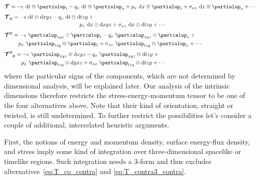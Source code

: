 \documentclass[\ifafour a4paper,12pt,\else a5paper,10pt,\fi%
onecolumn,oneside,article,%
british%
]{memoir}
\makeatletter
\theoremstyle{remark}
\theoremstyle{innote}
\newcommand*{\de}{\partialup}%
\newcommand*{\di}{\mathrm{d}}%
\renewcommand*{\|}[1][]{\nonscript\,#1\vert\nonscript\;\mathopen{}}
\newcommand*{\q}{}%
\DeclareRobustCommand*{\q}{%
  \mathbin{\mathpalette\bigcdot@{}}%
}
\newcommand*{\bigcdot@scalefactor}{0.7}
\newcommand*{\bigcdot@widthfactor}{1.5}
\newcommand*{\bigcdot@}[2]{%
  \sbox0{$#1\vcenter{}$}%
  \sbox2{$#1\cdot\m@th$}%
  \hbox to \bigcdot@widthfactor\wd2{%
    \hfil
    \raise\ht0\hbox{%
      \scalebox{\bigcdot@scalefactor}{%
        \lower\ht0\hbox{$#1\bullet\m@th$}%
      }%
    }%
    \hfil
  }%
}
\newcommand*{\yT}{\bm{\mathcal{T}}}
\renewcommand*{\i}{\indices}
\newcommand*{\en}{\epsilon}
\newcommand*{\yq}{q}
\newcommand*{\yp}{p}
\newcommand*{\yt}{\sigma}
\newcommand*{\rul}{{\mkern2mu\rule[-0.1ex]{0.75pt}{1.1ex}\mkern2mu}}
\DeclarePairedDelimiter\mul{\rul}{\rul}%
\makeatother
\begin{document}
\begin{subequations}
  \label{eq:T_alternatives}
  \begin{align}
    \label{eq:T_co_contra}
    &\yT\i{_{\q}^{\q}} = -\en\  \di t\otimes\de_{t} 
      -\yq_{x}\  \di t\otimes\de_{x} +
      \yp_{x}\  \di x\otimes\de_{t} +
      \yt_{x x}\  \di x\otimes\de_{x} + \dotsb
    \\[\jot]
    \label{eq:T_co_co3}
    &\!\begin{multlined}[b][0.85\textwidth]
      \yT\i{_{\q\mul{\q\q\q}}} =
      -\en\  \di t\otimes\di xyz 
      -\yq_{x}\  \di t\otimes\di tzy +{}\\
      \yp_{x}\  \di x\otimes\di xyz 
      +\yt_{x x}\  \di x\otimes\di tzy + \dotsb
    \end{multlined}
    \\[\jot]
    \label{eq:T_contra3_contra}
    &\!\begin{multlined}[b][0.85\textwidth]
      \yT\i{^{\mul{\q\q\q}\q}} = -\en\  \de_{xyz} \otimes\de_{t} 
      -\yq_{x}\  \de_{xyz}\otimes\de_{x} +{}\\
      \yp_{x}\  \de_{tzy} \otimes\de_{t} +
      \yt_{x x}\  \de_{tzy}\otimes\de_{x} + \dotsb
    \end{multlined}
    \\[\jot]
    \label{eq:T_contra3_co3}
    &\!\begin{multlined}[b][0.85\textwidth]
      \yT\i{^{\mul{\q\q\q}}_{\mul{\q\q\q}}} = -\en\  \de_{xyz} \otimes\di xyz 
      -\yq_{x}\  \de_{xyz}\otimes\di tzy +{}\\
      \yp_{x}\  \de_{tzy} \otimes\di yxz 
      + \yt_{x x}\  \de_{tzy}\otimes\di tzy
      + \dotsb
    \end{multlined}
  \end{align}
\end{subequations}
where the particular signs of the components, which are not determined by
dimensional analysis, will be explained later. Our analysis of the
intrinsic dimensions therefore restricts the stress-energy-momentum tensor
to be one of the four alternatives above. Note that their kind of
orientation, straight or twisted, is still undetermined. To further
restrict the possibilities let's consider a couple of additional,
interrelated heuristic arguments.

First, the notions of energy and momentum density, surface energy-flux
density, and stress imply some kind of integration over three-dimensional
spacelike or timelike regions. Such integration needs a 3-form and thus
excludes alternatives~\eqref{eq:T_co_contra} and
\eqref{eq:T_contra3_contra}.
\end{document}
